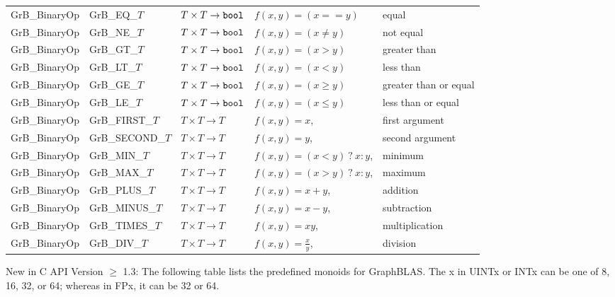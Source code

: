 \documentclass[11pt]{article}
\begin{document}
\begin{tabular}{l|l|l|ll}
{\sf GrB\_BinaryOp}   & {\sf GrB\_EQ\_$T$}    & $T \times T \rightarrow {\tt bool}$  & $f(x,y) = (x == y)$ & equal \\
{\sf GrB\_BinaryOp}   & {\sf GrB\_NE\_$T$}    & $T \times T \rightarrow {\tt bool}$  & $f(x,y) = (x \neq y)$ & not equal \\
{\sf GrB\_BinaryOp}   & {\sf GrB\_GT\_$T$}    & $T \times T \rightarrow {\tt bool}$  & $f(x,y) = (x > y)$ & greater than  \\
{\sf GrB\_BinaryOp}   & {\sf GrB\_LT\_$T$}    & $T \times T \rightarrow {\tt bool}$  & $f(x,y) = (x < y)$ & less than  \\
{\sf GrB\_BinaryOp}   & {\sf GrB\_GE\_$T$}    & $T \times T \rightarrow {\tt bool}$  & $f(x,y) = (x \geq y)$ & greater than or equal \\
{\sf GrB\_BinaryOp}   & {\sf GrB\_LE\_$T$}    & $T \times T \rightarrow {\tt bool}$  & $f(x,y) = (x \leq y)$ & less than or equal \\
{\sf GrB\_BinaryOp}   & {\sf GrB\_FIRST\_$T$} & $T \times T \rightarrow T$  & $f(x,y) = x$, & first argument \\
{\sf GrB\_BinaryOp}   & {\sf GrB\_SECOND\_$T$}& $T \times T \rightarrow T$  & $f(x,y) = y$, & second argument \\
{\sf GrB\_BinaryOp}   & {\sf GrB\_MIN\_$T$}   & $T \times T \rightarrow T$  & $f(x,y) = (x < y)~?~x : y$, & minimum \\
{\sf GrB\_BinaryOp}   & {\sf GrB\_MAX\_$T$}   & $T \times T \rightarrow T$  & $f(x,y) = (x > y)~?~x : y$, & maximum \\
{\sf GrB\_BinaryOp}   & {\sf GrB\_PLUS\_$T$}  & $T \times T \rightarrow T$  & $f(x,y) = x + y$, & addition \\
{\sf GrB\_BinaryOp}   & {\sf GrB\_MINUS\_$T$} & $T \times T \rightarrow T$  & $f(x,y) = x - y$, & subtraction \\
{\sf GrB\_BinaryOp}   & {\sf GrB\_TIMES\_$T$} & $T \times T \rightarrow T$  & $f(x,y) = xy$, & multiplication \\
{\sf GrB\_BinaryOp}   & {\sf GrB\_DIV\_$T$}   & $T \times T \rightarrow T$  & $f(x,y) = \frac{x}{y}$, & division \\ \hline
\end{tabular}


{\color{red} New in C API Version $\geq$ 1.3}: The following table lists the 
predefined monoids for GraphBLAS. The {\sf x} in {\sf UINTx} or {\sf INTx} can 
be one of 8, 16, 32, or 64; whereas in {\sf FPx}, it can be 32 or 64.
\end{document}
